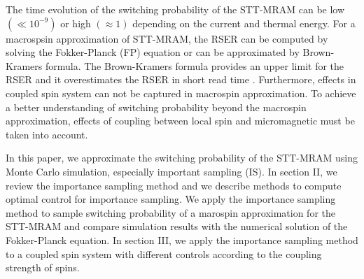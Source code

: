 \documentclass[journal,transmag]{IEEEtran}
\begin{document}
The time evolution of the switching probability of the STT-MRAM can be low $(\ll 10^{-9})$ or high $(\approx 1)$ depending on the current and thermal energy. For a macrospsin approximation of STT-MRAM, the RSER can be computed by solving the Fokker-Planck (FP) equation or can be approximated by Brown-Kramers formula. The Brown-Kramers formula provides an upper limit for the RSER and it overestimates the RSER in short read time  \cite{6242414}. Furthermore, effects in coupled spin system can not be captured in macrospin approximation. To achieve a better understanding of switching probability beyond the macrospin approximation, effects of coupling between local spin and micromagnetic  must be taken into account.

In this paper, we approximate the switching probability of the STT-MRAM using Monte Carlo simulation, especially important sampling (IS). In section II, we review the importance sampling method and we describe methods to compute optimal control for importance sampling. We apply the importance sampling method to sample switching probability of a marospin approximation for the STT-MRAM and compare simulation results with the numerical solution of the Fokker-Planck equation. In section III, we apply the importance sampling method to a coupled spin system with different controls according to the coupling strength of spins.







%
%
\end{document}
